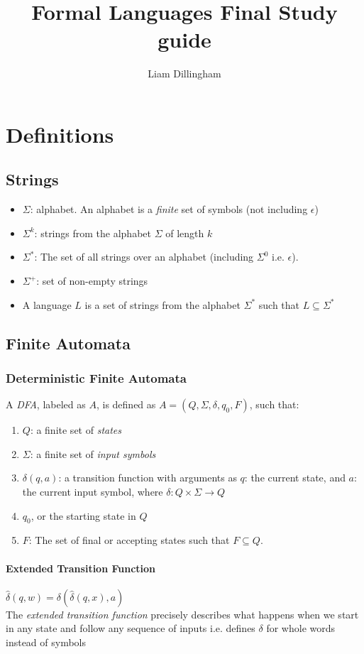 \documentclass[20pt]{article} %
\title{Formal Languages Final Study guide}
\author{Liam Dillingham}
\begin{document}
\maketitle

\section{Definitions}
\subsection{Strings}
\begin{itemize}
\item $\Sigma$: alphabet.  An alphabet is a \textit{finite} set of symbols (not including $\epsilon$)
\item $\Sigma^{k}$: strings from the alphabet $\Sigma$ of length $k$
\item $\Sigma^{*}$: The set of all strings over an alphabet (including $\Sigma^{0}$ i.e. $\epsilon$).
\item $\Sigma^{+}$: set of non-empty strings
\item A language $L$ is a set of strings from the alphabet $\Sigma^{*}$ such that $L \subseteq \Sigma^{*}$
\end{itemize}
\subsection{Finite Automata}
\subsubsection{Deterministic Finite Automata}
A \textit{DFA}, labeled as $A$, is defined as $A = (Q, \Sigma, \delta, q_0, F)$, such that:
\begin{enumerate}
\item $Q$: a finite set of \textit{states}
\item $\Sigma$: a finite set of \textit{input symbols}
\item $\delta(q, a)$: a transition function with arguments as $q$: the current state, and $a$: the current input symbol, where $\delta: Q \times \Sigma \rightarrow Q$
\item $q_0$, or the starting state in $Q$
\item $F$: The set of final or accepting states such that $F \subseteq Q$.
\end{enumerate}
\paragraph{Extended Transition Function}  $\hat{\delta}(q,w) = \delta(\hat{\delta}(q,x), a)$\\
The \textit{extended transition function} precisely describes what happens when we start in any state and follow any sequence of inputs i.e. defines $\delta$ for whole words instead of symbols
\end{document}
